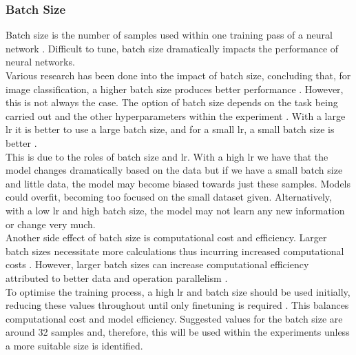 \subsubsection{Batch Size}
\label{sec: Batch Size}
Batch size is the number of samples used within one training pass of a neural network \cite{batch-size-on-the-generalizability}. Difficult to tune, batch size dramatically impacts the performance of neural networks.\\
Various research has been done into the impact of batch size, concluding that, for image classification, a higher batch size produces better performance \cite{batch-size-on-the-performance}. However, this is not always the case. The option of batch size depends on the task being carried out and the other hyperparameters within the experiment \cite{batch-size-on-the-generalizability}. With a large \acrshort{lr} it is better to use a large batch size, and for a small \acrshort{lr}, a small batch size is better \cite{batch-size-on-the-generalizability}.\\
This is due to the roles of batch size and \acrshort{lr}. With a high \acrshort{lr} we have that the model changes dramatically based on the data but if we have a small batch size and little data, the model may become biased towards just these samples. Models could overfit, becoming too focused on the small dataset given. Alternatively, with a low \acrshort{lr} and high batch size, the model may not learn any new information or change very much.\\
Another side effect of batch size is computational cost and efficiency. Larger batch sizes necessitate more calculations thus incurring increased computational costs \cite{batch-size-on-the-performance}. However, larger batch sizes can increase computational efficiency attributed to better data and operation parallelism \cite{Adaptive-Batch-Sizes}.\\
To optimise the training process, a high \acrshort{lr} and batch size should be used initially, reducing these values throughout until only finetuning is required \cite{batch-size-on-the-generalizability}. This balances computational cost and model efficiency. Suggested values for the batch size are around 32 samples and, therefore, this will be used within the experiments unless a more suitable size is identified.
